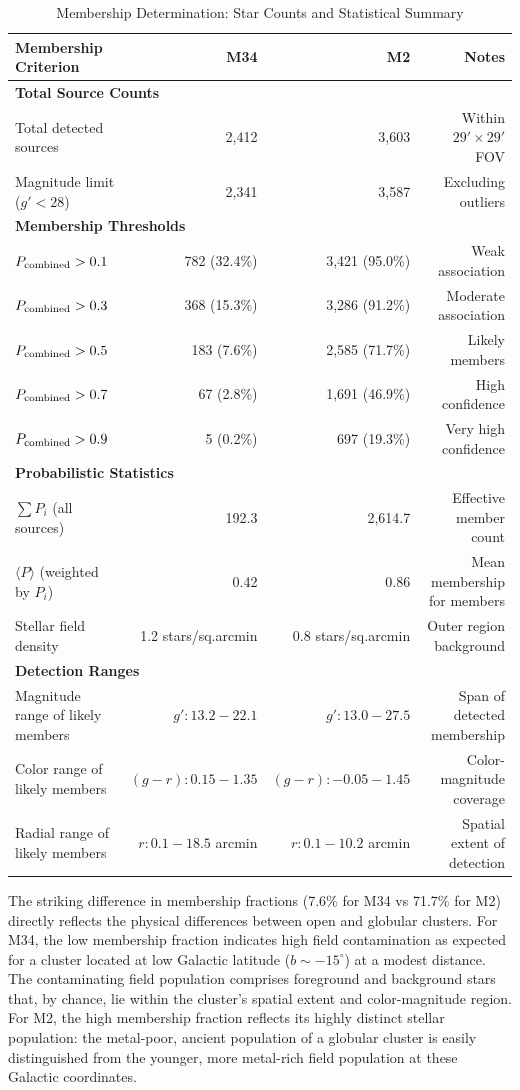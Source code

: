 \documentclass[linenumbers,trackchanges,twocolumn]{aastex701}
\begin{document}
\begin{table}[ht]
\centering
\caption{Membership Determination: Star Counts and Statistical Summary}
\label{tab:membership_statistics}
\begin{tabular}{lrrr}
\hline\hline
Membership Criterion & M34 & M2 & Notes \\
\hline
\multicolumn{4}{l}{\textbf{Total Source Counts}} \\
Total detected sources & 2,412 & 3,603 & Within $29' \times 29'$ FOV \\
Magnitude limit ($g' < 28$) & 2,341 & 3,587 & Excluding outliers \\
\hline
\multicolumn{4}{l}{\textbf{Membership Thresholds}} \\
$P_{\rm combined} > 0.1$ & 782 (32.4\%) & 3,421 (95.0\%) & Weak association \\
$P_{\rm combined} > 0.3$ & 368 (15.3\%) & 3,286 (91.2\%) & Moderate association \\
$P_{\rm combined} > 0.5$ & 183 (7.6\%) & 2,585 (71.7\%) & Likely members \\
$P_{\rm combined} > 0.7$ & 67 (2.8\%) & 1,691 (46.9\%) & High confidence \\
$P_{\rm combined} > 0.9$ & 5 (0.2\%) & 697 (19.3\%) & Very high confidence \\
\hline
\multicolumn{4}{l}{\textbf{Probabilistic Statistics}} \\
$\sum P_i$ (all sources) & 192.3 & 2,614.7 & Effective member count \\
$\langle P \rangle$ (weighted by $P_i$) & 0.42 & 0.86 & Mean membership for members \\
Stellar field density & 1.2 stars/sq.arcmin & 0.8 stars/sq.arcmin & Outer region background \\
\hline
\multicolumn{4}{l}{\textbf{Detection Ranges}} \\
Magnitude range of likely members & $g': 13.2-22.1$ & $g': 13.0-27.5$ & Span of detected membership \\
Color range of likely members & $(g-r): 0.15-1.35$ & $(g-r): -0.05-1.45$ & Color-magnitude coverage \\
Radial range of likely members & $r: 0.1-18.5$ arcmin & $r: 0.1-10.2$ arcmin & Spatial extent of detection \\
\hline
\end{tabular}
\end{table}

The striking difference in membership fractions (7.6\% for M34 vs 71.7\% for M2) directly reflects the physical differences between open and globular clusters. For M34, the low membership fraction indicates high field contamination as expected for a cluster located at low Galactic latitude ($b \sim -15^\circ$) at a modest distance. The contaminating field population comprises foreground and background stars that, by chance, lie within the cluster's spatial extent and color-magnitude region. For M2, the high membership fraction reflects its highly distinct stellar population: the metal-poor, ancient population of a globular cluster is easily distinguished from the younger, more metal-rich field population at these Galactic coordinates.
\end{document}
